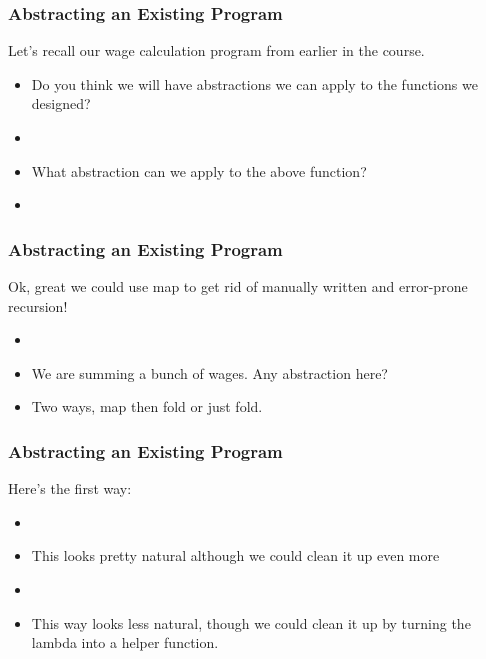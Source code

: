 \documentclass{beamer}
\begin{document}
\begin{frame}
  \frametitle{Abstracting an Existing Program}
  Let's recall our wage calculation program from earlier in the course.
  \begin{itemize}
  \item<2-> Do you think we will have abstractions we can apply to the functions
    we designed?
  \item<3-> \calculateWages
  \item<4-> What abstraction can we apply to the above function?
  \item<5-> \calcMap    
  \end{itemize}
\end{frame}






\begin{frame}
  \frametitle{Abstracting an Existing Program}
  Ok, great we could use map to get rid of manually written
  and error-prone recursion!
  \begin{itemize}
  \item<2-> \totalWages
  \item<3-> We are summing a bunch of wages. Any abstraction here?
  \item<4-> Two ways, map then fold or just fold.
  \end{itemize}
\end{frame}

\begin{frame}
  \frametitle{Abstracting an Existing Program}
  Here's the first way:
  \begin{itemize}
  \item<1-> \totalMapFold
  \item<2-> This looks pretty natural although we could clean it up even more
  \item<3-> \totalFold
  \item<4-> This way looks less natural, though we could clean it up by
    turning the lambda into a helper function.
  \end{itemize}
\end{frame}
\end{document}
